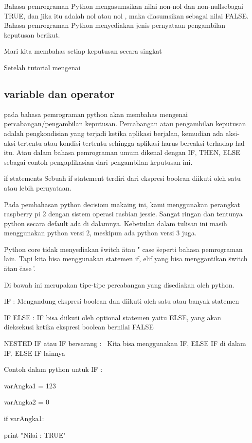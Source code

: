 Bahasa pemrograman Python mengasumsikan nilai   non-nol   dan   non-nullsebagai TRUE, dan jika itu adalah   nol   atau   nol   , maka diasumsikan sebagai nilai FALSE. 
Bahasa pemrograman Python menyediakan jenis pernyataan pengambilan keputusan berikut. 

 
Mari kita membahas setiap keputusan secara singkat  

 
Setelah tutorial mengenai  
\subsection{variable dan operator}
pada bahasa pemrograman python akan membahas mengenai percabangan/pengambilan keputusan. Percabangan atau pengambilan keputusan adalah pengkondisian yang terjadi ketika aplikasi berjalan, kemudian ada aksi-aksi tertentu atau kondisi tertentu sehingga aplikasi harus bereaksi terhadap hal itu. Atau dalam bahasa pemrograman umum dikenal dengan IF, THEN, ELSE sebagai contoh pengaplikasian dari pengambilan keputusan ini. 

if statements
Sebuah if statement terdiri dari ekspresi boolean diikuti oleh satu atau lebih pernyataan.
 
Pada pembahasan python decisiom makaing ini, kami menggunakan perangkat raspberry pi 2 dengan sistem operasi rasbian jessie. Sangat ringan dan tentunya python secara default ada di dalamnya. Kebetulan dalam tulisan ini masih menggunakan python versi 2, meskipun ada python versi 3 juga. 

 
Python core tidak menyediakan   \" switch  \"  atau   " case  \"  seperti bahasa pemrograman lain. Tapi kita bisa menggunakan statemen if, elif yang bisa menggantikan   \" switch  \"  atau   \" case  \" . 

 
Di bawah ini merupakan tipe-tipe percabangan yang disediakan oleh python. 

 
IF : Mengandung ekspresi boolean dan diikuti oleh satu atau banyak statemen 

 
IF ELSE : IF bisa diikuti oleh optional statemen yaitu ELSE, yang akan dieksekusi ketika ekspresi boolean bernilai FALSE 

 
NESTED IF atau IF bersarang :~ Kita bisa menggunakan IF, ELSE IF di dalam IF, ELSE IF lainnya 

 
Contoh dalam python untuk IF :  

 
varAngka1 = 123 

 
varAngka2 = 0 

 
if varAngka1: 

 
                                               print "Nilai : TRUE" 

